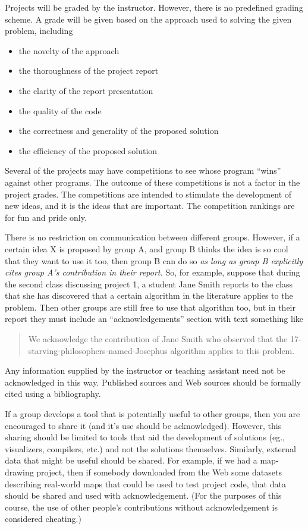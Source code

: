 Projects will be graded by the instructor.  However, there is no
predefined grading scheme.  A grade will be given based on the
approach used to solving the given problem, including
\begin{itemize}
\item the novelty of the approach
\item the thoroughness of the project report
\item the clarity of the report presentation
\item the quality of the code
\item the correctness and generality of the proposed solution
\item the efficiency of the proposed solution
\end{itemize}

Several of the projects may have competitions to see whose program
``wins'' against other programs.  The outcome of these competitions is
not a factor in the project grades.  The competitions are intended to
stimulate the development of new ideas, and it is the ideas that are
important.  The competition rankings are for fun and pride only.

There is no restriction on communication between different groups.
However, if a certain idea X is proposed by group A, and group B
thinks the idea is so cool that they want to use it too, then group
B can do so {\em as long as group B explicitly cites group A's
contribution in their report.}  So, for example, suppose that
during the second class discussing project 1, a student Jane Smith reports
to the class
that she has discovered that a certain algorithm in the literature
applies to the problem.  Then other groups are still free to use that
algorithm too, but in their report they must include an ``acknowledgements''
section with text something like
\begin{quotation}
We acknowledge the contribution of Jane Smith who observed that the
17-starving-philosophers-named-Josephus algorithm applies to this
problem.
\end{quotation}
Any information supplied by the instructor or
teaching assistant need not be
acknowledged in this way.  Published sources and
Web sources should be formally cited using a bibliography.

If a group develops a tool that is potentially useful to other groups,
then you are encouraged to share it (and it's use should be
acknowledged).  However, this sharing should be limited to tools that
aid the development of solutions (eg., visualizers, compilers, etc.)
and not the solutions themselves.  Similarly, external data that might
be useful should be shared.  For example, if we had a map-drawing
project, then if somebody downloaded from the Web some datasets describing
real-world maps that could be used to test project code, that data
should be shared and used with acknowledgement.  (For the purposes
of this course, the use of other people's contributions without
acknowledgement is considered cheating.)

